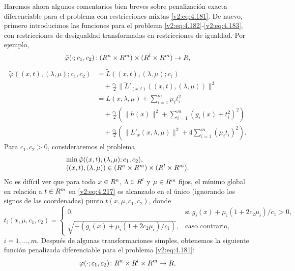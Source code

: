 Haremos ahora algunos comentarios bien breves sobre penalización exacta diferenciable para el problema con restricciones mixtas \eqref{v2:eq:4.181}. De nuevo, primero introducimos las funciones para el problema \eqref{v2:eq:4.182}-\eqref{v2:eq:4.183}, con restricciones de desigualdad transformadas en restricciones de igualdad. Por ejemplo,
\[
    \tilde{\varphi}(\cdot; c_1, c_2) \colon (R^n \times R^m) \times (R^l \times R^m) \to R,
\]
\begin{align}
    \tilde{\varphi}((x, t), (\lambda, \mu); c_1, c_2) &= \tilde{L}((x, t), (\lambda, \mu); c_1) \nonumber \\
    &\quad + \frac{c_2}{2} \|\tilde{L}'_{(x,t)}((x, t), (\lambda, \mu))\|^2 \nonumber \\
    &= L(x, \lambda, \mu) + \sum_{i=1}^m \mu_i t_i^2 \nonumber \\
    &\quad + \frac{c_1}{2} \left( \|h(x)\|^2 + \sum_{i=1}^m (g_i(x) + t_i^2)^2 \right) \nonumber \\
    &\quad + \frac{c_2}{2} \left( \|L'_x(x, \lambda, \mu)\|^2 + 4\sum_{i=1}^m (\mu_i t_i)^2 \right).
    \label{v2:eq:4.216}
\end{align}
Para $c_1, c_2 > 0$, consideraremos el problema
\begin{equation}
    \begin{array}{l}
        \min \tilde{\varphi}((x, t), (\lambda, \mu); c_1, c_2), \\
        ((x, t), (\lambda, \mu)) \in (R^n \times R^m) \times (R^l \times R^m).
    \end{array}
    \label{v2:eq:4.217}
\end{equation}
No es difícil ver que para todo $x \in R^n$, $\lambda \in R^l$ y $\mu \in R^m$ fijos, el mínimo global en relación a $t \in R^m$ en \eqref{v2:eq:4.217} es alcanzado en el único (ignorando los signos de las coordenadas) punto $t(x, \mu, c_1, c_2)$, donde
\begin{equation}
    t_i(x, \mu, c_1, c_2) = \begin{cases}
        0, & \text{si } g_i(x) + \mu_i(1 + 2c_2\mu_i)/c_1 > 0, \\
        \sqrt{-(g_i(x) + \mu_i(1 + 2c_2\mu_i)/c_1)}, & \text{caso contrario,}
    \end{cases}
    \label{v2:eq:4.218}
\end{equation}
$i = 1, \dots, m$. Después de algunas transformaciones simples, obtenemos la siguiente función penalizada diferenciable para el problema \eqref{v2:eq:4.181}:
\[
    \varphi(\cdot; c_1, c_2) \colon R^n \times R^l \times R^m \to R,
\]
